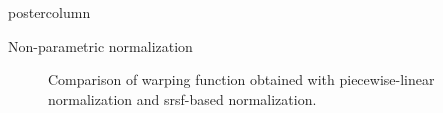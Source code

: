 \documentclass[final, size=a0]{beamer}
\begin{document}
\begin{frame}
\begin{columns}
\begin{column}{.33\textwidth}
\begin{beamercolorbox}[center,wd=\textwidth]{postercolumn}
\begin{minipage}[T]{.95\textwidth}
{\begin{alertblock}{Non-parametric normalization}
              \begin{figure}
                \centering
                \hfill
                \hfill
                \caption{Comparison of warping function obtained with \protect{} piecewise-linear normalization and \protect{} \acs{srsf}-based normalization.}
                \label{fig:non-parametric}
              \end{figure}
            \end{alertblock}
            
}
\end{minipage}
\end{beamercolorbox}
\end{column}
\end{columns}
\end{frame}
\end{document}
